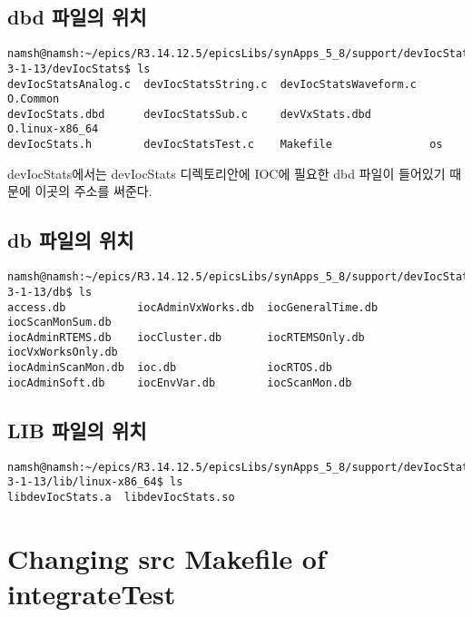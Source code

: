 \documentclass[11pt
  , a4paper
  , article
  , oneside
]{memoir}
\begin{document}
\subsection{dbd 파일의 위치}
\begin{lstlisting}[style=termstyle]
namsh@namsh:~/epics/R3.14.12.5/epicsLibs/synApps_5_8/support/devIocStats-3-1-13/devIocStats$ ls
devIocStatsAnalog.c  devIocStatsString.c  devIocStatsWaveform.c  O.Common
devIocStats.dbd      devIocStatsSub.c     devVxStats.dbd         O.linux-x86_64
devIocStats.h        devIocStatsTest.c    Makefile               os
\end{lstlisting}
devIocStats에서는 devIocStats 디렉토리안에 IOC에 필요한 dbd 파일이 들어있기 때문에 이곳의 주소를 써준다.
\subsection{db 파일의 위치}
\begin{lstlisting}[style=termstyle]
namsh@namsh:~/epics/R3.14.12.5/epicsLibs/synApps_5_8/support/devIocStats-3-1-13/db$ ls
access.db           iocAdminVxWorks.db  iocGeneralTime.db  iocScanMonSum.db
iocAdminRTEMS.db    iocCluster.db       iocRTEMSOnly.db    iocVxWorksOnly.db
iocAdminScanMon.db  ioc.db              iocRTOS.db
iocAdminSoft.db     iocEnvVar.db        iocScanMon.db
\end{lstlisting}
\subsection{LIB 파일의 위치}
\begin{lstlisting}[style=termstyle]
namsh@namsh:~/epics/R3.14.12.5/epicsLibs/synApps_5_8/support/devIocStats-3-1-13/lib/linux-x86_64$ ls
libdevIocStats.a  libdevIocStats.so
\end{lstlisting}
\section{Changing src Makefile of integrateTest}
\end{document}
